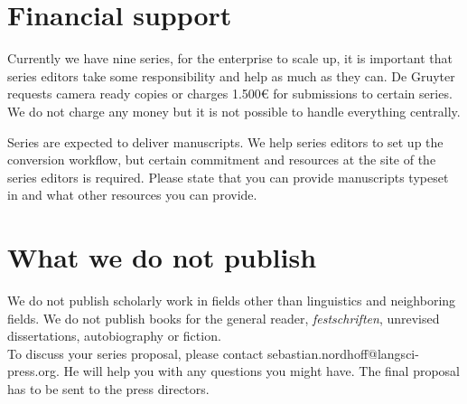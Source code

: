 

\section{Financial support}

Currently we have nine series, for the enterprise to scale up, it is important that series editors
take some responsibility and help as much as they can. De Gruyter requests camera ready copies or
charges 1.500€ for submissions to certain series. We do not charge any money but it is not possible
to handle everything centrally.

Series are expected to deliver \latex manuscripts. We help series editors to set up the conversion
workflow, but certain commitment and resources at the site of the series editors is required. Please
state that you can provide manuscripts typeset in \latex and what other resources you can provide.


\section{What we do not publish}

We do not publish scholarly work in fields other than linguistics
and neighboring fields. We do not publish books for the general reader,
\textit{festschriften}, unrevised dissertations, autobiography or
fiction.\\


To discuss your series proposal, please contact sebastian.nordhoff@langsci-press.org.  He will help you with any questions you might have. The final proposal has to be sent to the press directors.






